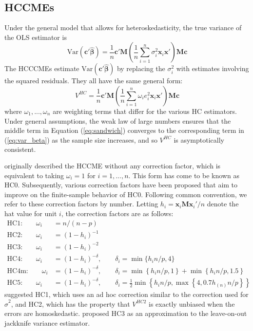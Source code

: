 \documentclass[12pt]{article}\usepackage[]{graphicx}\usepackage[]{color}
\newcommand{\Var}{\text{Var}}
\newcommand{\bm}{\mathbf}
\newcommand{\bs}{\boldsymbol}
\begin{document}
\subsection{HCCMEs}

Under the general model that allows for heteroskedasticity, the true variance of the OLS estimator is 
\begin{equation}
\label{eq:var_beta}
\Var\left(\bm{c}'\bs{\hat\beta}\right) = \frac{1}{n} \bm{c}'\bm{M} \left(\frac{1}{n}\sum_{i=1}^n \sigma_i^2 \bm{x}_i\bm{x}'\right) \bm{M}\bm{c}
\end{equation}
The HCCCMEs estimate $\Var\left(\bm{c}'\bs{\hat\beta}\right)$ by replacing the $\sigma_i^2$ with estimates involving the squared residuals. They all have the same general form:  
\begin{equation}
\label{eq:sandwich}
V^{HC} = \frac{1}{n} \bm{c}'\bm{M} \left(\frac{1}{n}\sum_{i=1}^n \omega_i e_i^2 \bm{x}_i\bm{x}'\right)\bm{M} \bm{c}
\end{equation}
where $\omega_{1},...,\omega_{n}$ are weighting terms that differ for the various HC estimators. 
Under general assumptions, the weak law of large numbers ensures that the middle term in Equation (\ref{eq:sandwich}) converges to the corresponding term in (\ref{eq:var_beta}) as the sample size increases, and so $V^{HC}$ is asymptotically consistent. 

\citet{White1980heteroskedasticity} originally described the HCCME without any correction factor, which is equivalent to taking $\omega_i = 1$ for $i = 1,...,n$. 
This form has come to be known as HC0. 
Subsequently, various correction factors have been proposed that aim to improve on the finite-sample behavior of HC0. 
Following common convention, we refer to these correction factors by number. Letting $h_i = \bm{x}_i \bm{M} \bm{x}_i' / n$ denote the hat value for unit $i$, the correction factors are as follows:
\begin{align*}
\text{HC1:} \qquad \omega_i &= n / (n - p) \\
\text{HC2:} \qquad \omega_i &= (1 - h_i)^{-1} \\
\text{HC3:} \qquad \omega_i &= (1 - h_i)^{-2} \\
\text{HC4:} \qquad \omega_i &= (1 - h_i)^{-\delta}, \qquad \delta_i = \min\{h_i n / p, 4\} \\
\text{HC4m:} \qquad \omega_i &= (1 - h_i)^{-\delta}, \qquad \delta_i = \min\left\{h_i n / p, 1 \right\} + \min\left\{h_i n / p, 1.5 \right\} \\
\text{HC5:} \qquad \omega_i &= (1 - h_i)^{-\delta}, \qquad \delta_i = \frac{1}{2}\min\left\{h_i n / p, \max \left\{4, 0.7 h_{(n)} n / p\right\}\right\}
\end{align*}
\citet{MacKinnon1985some} suggested HC1, which uses an ad hoc correction similar to the correction used for $\hat\sigma^2$, and HC2, which has the property that $V^{HC2}$ is exactly unbiased when the errors are homoskedastic. 
\citet{Davidson1993estimation} proposed HC3 as an approximation to the leave-on-out jackknife variance estimator. 
\end{document}
